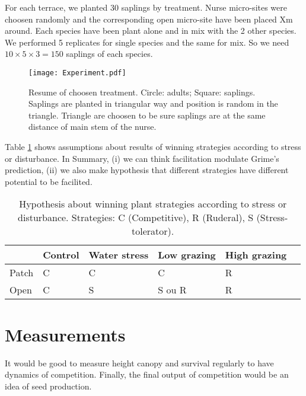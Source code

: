\documentclass[12pt]{article} %
\begin{document}
For each terrace, we planted 30 saplings by treatment. Nurse micro-sites were choosen randomly and the corresponding open micro-site have been placed Xm around. Each species have been plant alone and in mix with the 2 other species. We performed  5 replicates for single species and the same for mix. So we need $10\times5\times3=150$ saplings of each species.


\begin{figure}
\begin{center}
\texttt{[image: Experiment.pdf]}
\end{center}
\caption{Resume of choosen treatment. Circle: adults; Square: saplings. Saplings are planted in triangular way and position is random in the triangle. Triangle are choosen to be sure saplings are at the same distance of main stem of the nurse. \label{exp}}
\end{figure}

Table \ref{hyp} shows assumptions about results of winning strategies according to stress or disturbance. In Summary, (i) we can think facilitation modulate Grime's prediction, (ii) we also make hypothesis that different strategies have different potential to be facilited.


\begin{table}
\begin{center}
\begin{tabular}{|l|l|l|l|l|l|}
  \hline
  & Control & Water stress & Low grazing & High grazing  \\
  \hline
  Patch & C & C & C & R \\
  \hline
  Open & C & S & S ou R & R \\
  \hline
\end{tabular} 
\end{center}
\caption{Hypothesis about winning plant strategies according to stress or disturbance.  Strategies: C (Competitive), R (Ruderal), S (Stress-tolerator). \label{hyp}}
\end{table}

\section{Measurements}
It would be good to measure height canopy and survival regularly to have dynamics of competition. Finally, the final output of competition would be an idea of seed production.
\end{document}
